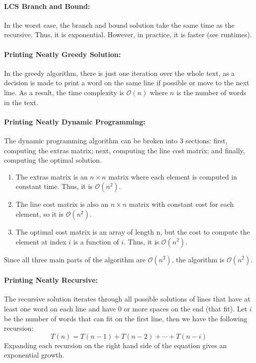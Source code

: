 \documentclass[a4paper,12pt]{article}
\newcommand{\bigO}{\mathcal{O}}
\begin{document}
			\paragraph{LCS Branch and Bound:} In the worst case, the branch and bound solution take the same time as the recursive. Thus, it is exponential. However, in practice, it is faster (see runtimes).

			\paragraph{Printing Neatly Greedy Solution:} In the greedy algorithm, there is just one iteration over the whole text, as a decision is made to print a word on the same line if possible or move to the next line. As a result, the time complexity is $\bigO(n)$ where $n$ is the number of words in the text.

			\paragraph{Printing Neatly Dynamic Programming:} The dynamic programming algorithm can be broken into 3 sections: first, computing the extras matrix; next, computing the line cost matrix; and finally, computing the optimal solution.
			\begin{enumerate}
				\item The extras matrix is an $n \times n$ matrix where each element is computed in constant time. Thus, it is $\bigO(n^2)$.
				\item The line cost matrix is also an $n \times n$ matrix with constant cost for each element, so it is $\bigO(n^2)$.
				\item The optimal cost matrix is an array of length n, but the cost to compute the element at index $i$ is a function of $i$. Thus, it is $\bigO(n^2)$.
			\end{enumerate}
			Since all three main parts of the algorithm are $\bigO(n^2)$, the algorithm is $\bigO(n^2)$.

			\paragraph{Printing Neatly Recursive:} The recursive solution iterates through all possible solutions of lines that have at least one word on each line and have 0 or more spaces on the end (that fit). Let $i$ be the number of words that can fit on the first line, then we have the following recursion:
				$$T(n) = T(n-1) + T(n-2) + \cdots + T(n-i)$$
			Expanding each recursion on the right hand side of the equation gives an exponential growth.
\end{document}
